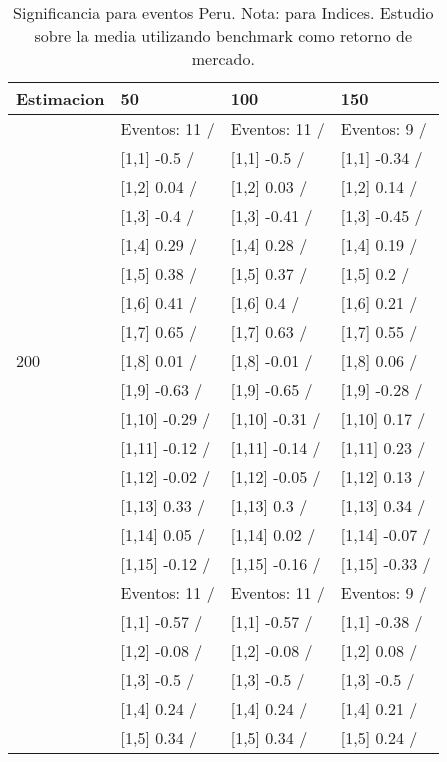 \begin{table}

\caption{Significancia para eventos Peru. Nota: para Indices. Estudio sobre la media utilizando benchmark como retorno de mercado.}
\centering
\begin{tabular}[t]{llll}
\toprule
Estimacion & 50 & 100 & 150\\
\midrule
 & Eventos:  11 / & Eventos:  11 / & Eventos:  9 /\\
 & {}[1,1] -0.5  / & {}[1,1] -0.5  / & {}[1,1] -0.34  /\\
 & {}[1,2] 0.04  / & {}[1,2] 0.03  / & {}[1,2] 0.14  /\\
 & {}[1,3] -0.4  / & {}[1,3] -0.41  / & {}[1,3] -0.45  /\\
 & {}[1,4] 0.29  / & {}[1,4] 0.28  / & {}[1,4] 0.19  /\\
\addlinespace
 & {}[1,5] 0.38  / & {}[1,5] 0.37  / & {}[1,5] 0.2  /\\
 & {}[1,6] 0.41  / & {}[1,6] 0.4  / & {}[1,6] 0.21  /\\
 & {}[1,7] 0.65  / & {}[1,7] 0.63  / & {}[1,7] 0.55  /\\
200 & {}[1,8] 0.01  / & {}[1,8] -0.01  / & {}[1,8] 0.06  /\\
 & {}[1,9] -0.63  / & {}[1,9] -0.65  / & {}[1,9] -0.28  /\\
\addlinespace
 & {}[1,10] -0.29  / & {}[1,10] -0.31  / & {}[1,10] 0.17  /\\
 & {}[1,11] -0.12  / & {}[1,11] -0.14  / & {}[1,11] 0.23  /\\
 & {}[1,12] -0.02  / & {}[1,12] -0.05  / & {}[1,12] 0.13  /\\
 & {}[1,13] 0.33  / & {}[1,13] 0.3  / & {}[1,13] 0.34  /\\
 & {}[1,14] 0.05  / & {}[1,14] 0.02  / & {}[1,14] -0.07  /\\
\addlinespace
 & {}[1,15] -0.12  / & {}[1,15] -0.16  / & {}[1,15] -0.33  /\\
 & Eventos:  11 / & Eventos:  11 / & Eventos:  9 /\\
 & {}[1,1] -0.57  / & {}[1,1] -0.57  / & {}[1,1] -0.38  /\\
 & {}[1,2] -0.08  / & {}[1,2] -0.08  / & {}[1,2] 0.08  /\\
 & {}[1,3] -0.5  / & {}[1,3] -0.5  / & {}[1,3] -0.5  /\\
\addlinespace
 & {}[1,4] 0.24  / & {}[1,4] 0.24  / & {}[1,4] 0.21  /\\
 & {}[1,5] 0.34  / & {}[1,5] 0.34  / & {}[1,5] 0.24  /\\

\end{tabular}
\end{table}

